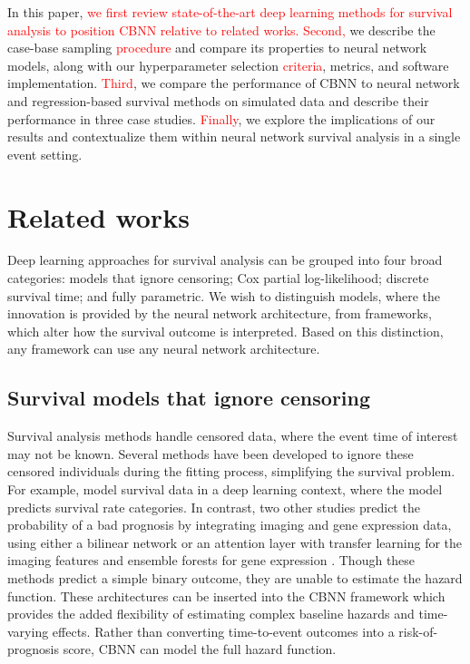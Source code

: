 \documentclass[preprint,12pt,authoryear]{elsarticle}
\begin{document}
In this paper, \textcolor{red}{we first review state-of-the-art deep learning methods for survival analysis to position CBNN relative to related works. Second,} we describe the case-base sampling \textcolor{red}{procedure} and compare its properties to neural network models, along with our hyperparameter selection \textcolor{red}{criteria}, metrics, and software implementation. \textcolor{red}{Third}, we compare the performance of CBNN to neural network and regression-based survival methods on simulated data and describe their performance in three case studies. \textcolor{red}{Finally}, we explore the implications of our results and contextualize them within neural network survival analysis in a single event setting.

 \color{red}
\section{Related works}\label{related}
 Deep learning approaches for survival analysis can be grouped into four broad categories: models that ignore censoring; Cox partial log-likelihood; discrete survival time; and fully parametric. We wish to distinguish models, where the innovation is provided by the neural network architecture, from frameworks, which alter how the survival outcome is interpreted. Based on this distinction, any framework can use any neural network architecture.

\subsection{Survival models that ignore censoring}

Survival analysis methods handle censored data, where the event time of interest may not be known. Several methods have been developed to ignore these censored individuals during the fitting process, simplifying the survival problem. For example, \citet{zadeh2020DeepSurvnet} model survival data in a deep learning context, where the model predicts survival rate categories. In contrast, two other studies predict the probability of a bad prognosis by integrating imaging and gene expression data, using either a bilinear network \citep{wang2021gpdbn} or an attention layer with transfer learning for the imaging features and ensemble forests for gene expression \citep{jia2023dccafn}. Though these methods predict a simple binary outcome, they are unable to estimate the hazard function. These architectures can be inserted into the CBNN framework which provides the added flexibility of estimating complex baseline hazards and time-varying effects. Rather than converting time-to-event outcomes into a risk-of-prognosis score, CBNN can model the full hazard function.
\end{document}
